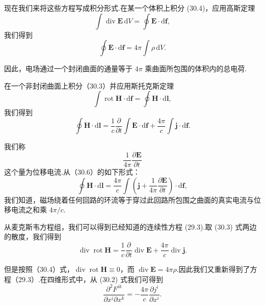 现在我们来将这些方程写成积分形式.在某一个体积上积分 (30.4)，应用高斯定理
\begin{equation*}
  \int\operatorname{div}\boldsymbol{E}\,\mathrm{d}V
  =\oint\boldsymbol{E}\cdot\mathrm{d}\boldsymbol{f},
\end{equation*}
我们得到
\begin{equation}
  \oint\boldsymbol{E}\cdot\mathrm{d}\boldsymbol{f}
  =4\pi\int\rho\,\mathrm{d}V.
\end{equation}

因此，电场通过一个封闭曲面的通量等于 $4\pi$ 乘曲面所包围的体积内的总电荷.

在一个非封闭曲面上积分（30.3）并应用斯托克斯定理
\begin{equation*}
  \int\operatorname{rot}\boldsymbol{H}\cdot\mathrm{d}\boldsymbol{f}
  =\oint\boldsymbol{H}\cdot\mathrm{d}\boldsymbol{l},
\end{equation*}
我们得到
\begin{equation}
  \oint\boldsymbol{H}\cdot\mathrm{d}\boldsymbol{l}
  =\frac{1}{c}\frac{\partial}{\partial t}
  \int\boldsymbol{E}\cdot\mathrm{d}\boldsymbol{f}
  +\frac{4\pi}{c}\int\boldsymbol{j}\cdot\mathrm{d}\boldsymbol{f}.
\end{equation}

我们称
\begin{equation}
  \frac{1}{4\pi}\frac{\partial\boldsymbol{E}}{\partial t}
\end{equation}
这个量为位移电流.从（30.6）的如下形式：
\begin{equation}
  \oint\boldsymbol{H}\cdot\mathrm{d}\boldsymbol{l}
  =\frac{4\pi}{c}\int\left(\boldsymbol{j}
  +\frac{1}{4\pi}\frac{\partial\boldsymbol{E}}{\partial t}\right)
  \cdot\mathrm{d}\boldsymbol{f},
\end{equation}
我们知道，磁场绕着任何回路的环流等于穿过此回路所包围之曲面的真实电流与位移电流之和乘 $4\pi/c$.

从麦克斯韦方程组，我们可以得到已经知道的连续性方程 (29.3).取 (30.3)
式两边的散度，我们得到
\begin{equation*}
  \operatorname{div}\operatorname{rot}\boldsymbol{H}
  =\frac{1}{c}\frac{\partial}{\partial t}\operatorname{div}\boldsymbol{E}
  +\frac{4\pi}{c}\operatorname{div}\boldsymbol{j}.
\end{equation*}

但是按照（30.4）式，$\operatorname{div}\operatorname{rot}\boldsymbol{H}\equiv0$，而
$\operatorname{div}\boldsymbol{E}=4\pi\rho$.因此我们又重新得到了方程（29.3）.在四维形式中，从
(30.2) 式我们可得到
\begin{equation*}
  \frac{\partial^2 F^{ik}}{\partial x^i\partial x^k}
  =-\frac{4\pi}{c}\frac{\partial j^i}{\partial x^i}.
\end{equation*}

